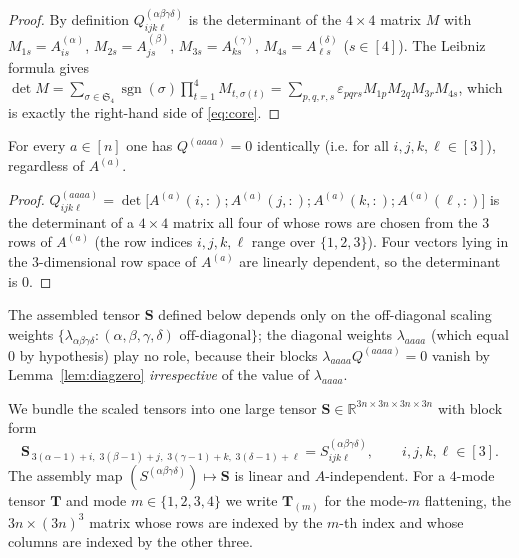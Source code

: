 \begin{proof}
By definition $Q^{(\alpha\beta\gamma\delta)}_{ijk\ell}$ is the determinant of the
$4\times4$ matrix $M$ with $M_{1s}=A^{(\alpha)}_{is}$, $M_{2s}=A^{(\beta)}_{js}$,
$M_{3s}=A^{(\gamma)}_{ks}$, $M_{4s}=A^{(\delta)}_{\ell s}$ ($s\in[4]$). The Leibniz
formula gives
$\det M=\sum_{\sigma\in\mathfrak S_4}\operatorname{sgn}(\sigma)\prod_{t=1}^4
M_{t,\sigma(t)}=\sum_{p,q,r,s}\varepsilon_{pqrs}M_{1p}M_{2q}M_{3r}M_{4s}$,
which is exactly the right-hand side of \eqref{eq:core}.
\end{proof}

\begin{lemma}\label{lem:diagzero}
For every $a\in[n]$ one has $Q^{(aaaa)}=0$ identically (i.e. for all
$i,j,k,\ell\in[3]$), regardless of $A^{(a)}$.
\end{lemma}

\begin{proof}
$Q^{(aaaa)}_{ijk\ell}=\det\!\big[A^{(a)}(i,:);A^{(a)}(j,:);A^{(a)}(k,:);A^{(a)}(\ell,:)\big]$
is the determinant of a $4\times4$ matrix all four of whose rows are chosen from the
$3$ rows of $A^{(a)}$ (the row indices $i,j,k,\ell$ range over $\{1,2,3\}$). Four
vectors lying in the $3$-dimensional row space of $A^{(a)}$ are linearly dependent, so
the determinant is $0$.
\end{proof}

\begin{corollary}\label{cor:diagfree}
The assembled tensor $\mathbf S$ defined below depends only on the off-diagonal scaling
weights $\{\lambda_{\alpha\beta\gamma\delta}:(\alpha,\beta,\gamma,\delta)\text{ off-diagonal}\}$;
the diagonal weights $\lambda_{aaaa}$ (which equal $0$ by hypothesis) play no role,
because their blocks $\lambda_{aaaa}Q^{(aaaa)}=0$ vanish by Lemma~\ref{lem:diagzero}
\emph{irrespective} of the value of $\lambda_{aaaa}$.
\end{corollary}

We bundle the scaled tensors into one large tensor
$\mathbf S\in\mathbb R^{3n\times3n\times3n\times3n}$ with block form
\begin{equation}\label{eq:assemble}
\mathbf S_{\,3(\alpha-1)+i,\;3(\beta-1)+j,\;3(\gamma-1)+k,\;3(\delta-1)+\ell}
=S^{(\alpha\beta\gamma\delta)}_{ijk\ell},
\qquad i,j,k,\ell\in[3].
\end{equation}
The assembly map $(S^{(\alpha\beta\gamma\delta)})\mapsto\mathbf S$ is linear and
$A$-independent. For a $4$-mode tensor $\mathbf T$ and mode $m\in\{1,2,3,4\}$ we write
$\mathbf T_{(m)}$ for the mode-$m$ flattening, the $3n\times(3n)^3$ matrix whose rows
are indexed by the $m$-th index and whose columns are indexed by the other three.


